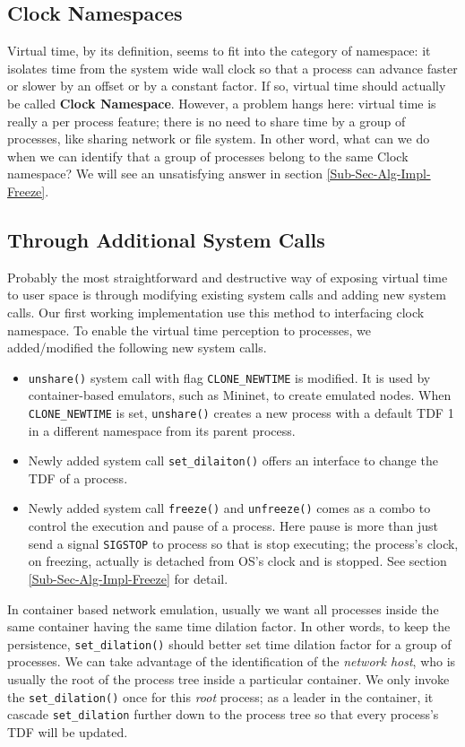 \documentclass{acm_proc_article-sp}
\begin{document}
\subsection{Clock Namespaces}
Virtual time, by its definition, seems to fit into the category of namespace: it isolates time from the system wide wall clock so that a process can advance faster or slower by an offset or by a constant factor. 
If so, virtual time should actually be called \textbf{Clock Namespace}. However, a problem hangs here: virtual time is really a per process feature; there is no need to share time by a group of processes, like sharing network or file system. 
In other word, what can we do when we can identify that a group of processes belong to the same Clock namespace? We will see an unsatisfying answer in section \ref{Sub-Sec-Alg-Impl-Freeze}.

\subsection{Through Additional System Calls}
Probably the most straightforward and destructive way of exposing virtual time to user space is through modifying existing system calls and adding new system calls. Our first working implementation use this method to interfacing clock namespace\cite{yan:vts:pads15, yan:vtmininet:sosr15}.
To enable the virtual time perception to processes, we added/modified the following new system calls.
\begin{itemize}

\item \texttt{unshare()} system call with flag \texttt{CLONE\_NEWTIME} is modified. It is used by container-based emulators, such as Mininet, to create emulated nodes. 
When \texttt{CLONE\_NEWTIME} is set, \texttt{unshare()} creates a new process with a default TDF 1 in a different namespace from its parent process.

\item Newly added system call \texttt{set\_dilaiton()} offers an interface to change the TDF of a process. 

\item Newly added system call \texttt{freeze()} and \texttt{unfreeze()} comes as a combo to control the execution and pause of a process. Here pause is more than just send a signal \texttt{SIGSTOP} to process so that is stop executing; the process's clock, on freezing, actually is detached from OS's clock and is stopped. See section \ref{Sub-Sec-Alg-Impl-Freeze} for detail.

\end{itemize}
In container based network emulation, usually we want all processes inside the same container having the same time dilation factor. In other words, to keep the persistence, \texttt{set\_dilation()} should better set time dilation factor for a group of processes. We can take advantage of the identification of the \textit{network host}, who is usually the root of the process tree inside a particular container. We only invoke the \texttt{set\_dilation()} once for this \textit{root} process; as a leader in the container, it cascade \texttt{set\_dilation} further down to the process tree so that every process's TDF will be updated.
\end{document}
